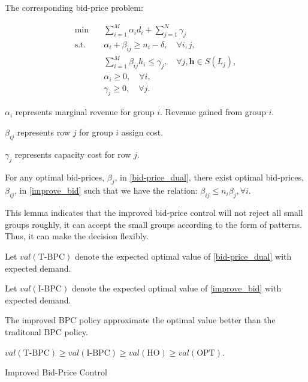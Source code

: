 The corresponding bid-price problem:

\begin{equation}\label{improve_bid}
    \begin{aligned}
    \min \quad & \sum_{i=1}^M \alpha_i d_i+ \sum_{j=1}^N \gamma_j \\
    \mathrm{s.t.} \quad & \alpha_i+\beta_{i j} \geq n_i-\delta, \quad \forall i, j, \\
    & \sum_{i=1}^M \beta_{i j} h_i \leq \gamma_j, \quad \forall j, \bm{h} \in S(L_j), \\
    & \alpha_i \geq 0, \quad \forall i, \\
    & \gamma_j \geq 0, \quad \forall j .
    \end{aligned}
\end{equation}

$\alpha_{i}$ represents marginal revenue for group $i$. Revenue gained from group $i$.

$\beta_{ij}$ represents row $j$ for group $i$ assign cost.

$\gamma_{j}$ represents capacity cost for row $j$.


\begin{lem}
For any optimal bid-prices, $\beta_{j}$, in \eqref{bid-price_dual}, there exist optimal bid-prices, $\beta_{ij}$, in \eqref{improve_bid} such that we have the relation:
$\beta_{ij} \leq n_{i} \beta_{j}, \forall i$.
\end{lem}


% 

This lemma indicates that the improved bid-price control will not reject all small groups roughly, it can accept the small groups according to the form of patterns. Thus, it can make the decision flexibly.

Let $val(\text{T-BPC})$ denote the expected optimal value of \eqref{bid-price_dual} with expected demand.

Let $val(\text{I-BPC})$ denote the expected optimal value of \eqref{improve_bid} with expected demand.


The improved BPC policy approximate the optimal value better than the traditonal BPC policy.

$val(\text{T-BPC}) \geq val(\text{I-BPC}) \geq val(\text{HO}) \geq val(\text{OPT})$.

\begin{algorithm}[H]
    \caption{Improved Bid-Price Control}\label{algo_improve_bid}
\end{algorithm}

